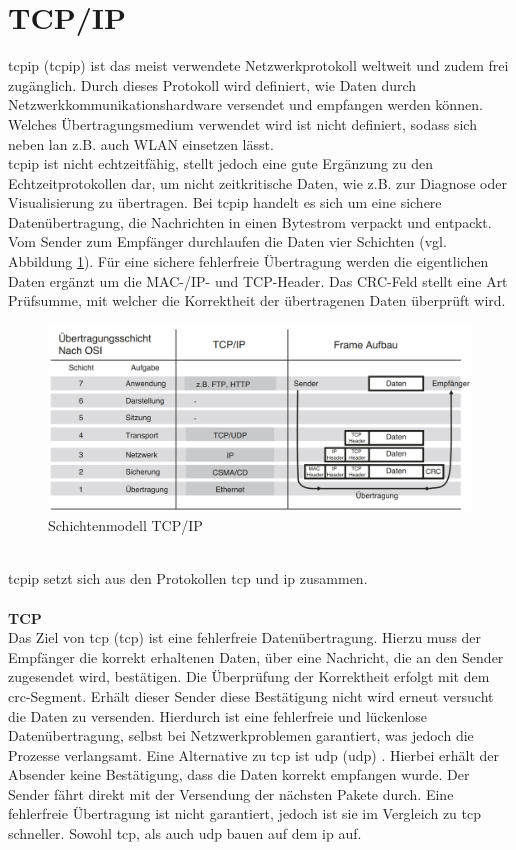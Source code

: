 \documentclass[ a4paper,
                oneside,
                toc=bibliography,
                toc=listof
                ]{scrbook}
\begin{document}
	\section{TCP/IP}
	\ac{tcpip} (\acl{tcpip}) ist das meist verwendete Netzwerkprotokoll weltweit und zudem frei zugänglich. Durch dieses Protokoll wird definiert, wie Daten durch Netzwerkkommunikationshardware versendet und empfangen werden können. Welches Übertragungsmedium verwendet wird ist  nicht definiert, sodass sich neben \ac{lan} z.B. auch WLAN einsetzen lässt.\cite{CS9_TCP} \cite{kim2016service} \\
	\ac{tcpip} ist nicht echtzeitfähig, stellt jedoch eine gute Ergänzung zu den Echtzeitprotokollen dar, um nicht zeitkritische Daten, wie z.B. zur Diagnose oder Visualisierung zu übertragen. Bei \ac{tcpip} handelt es sich um eine sichere Datenübertragung, die Nachrichten in einen Bytestrom verpackt und entpackt. Vom Sender zum Empfänger durchlaufen die Daten vier Schichten (vgl. Abbildung \ref{fig:Schichtenmodell}). Für eine sichere fehlerfreie Übertragung werden die eigentlichen Daten ergänzt um die MAC-/IP- und TCP-Header. Das CRC-Feld stellt eine Art Prüfsumme, mit welcher die Korrektheit der übertragenen Daten überprüft wird. \cite{hering2012elektrotechnik}
	\begin{figure}[!ht]
		\centering
		\includegraphics[width=1.0\linewidth]{./images/Schichtenmodell_TCP_IP.png}
		\caption{Schichtenmodell TCP/IP \cite{hering2012elektrotechnik}}
		\label{fig:Schichtenmodell}
	\end{figure} \\
	\ac{tcpip} setzt sich aus den Protokollen \acs{tcp} und \acs{ip} zusammen.\\
	\\
	\textbf{TCP}\\
	Das Ziel von \acs{tcp} (\acl{tcp}) ist eine fehlerfreie Datenübertragung. Hierzu muss der Empfänger die korrekt erhaltenen Daten, über eine Nachricht, die an den Sender zugesendet wird, bestätigen. Die Überprüfung der Korrektheit erfolgt mit dem \acs{crc}-Segment. Erhält dieser Sender diese Bestätigung nicht wird erneut versucht die Daten zu versenden. Hierdurch ist eine fehlerfreie und lückenlose Datenübertragung, selbst bei Netzwerkproblemen garantiert, was jedoch die Prozesse verlangsamt. Eine Alternative zu \acs{tcp} ist \acs{udp} (\acl{udp}) . Hierbei erhält der Absender keine Bestätigung, dass die Daten korrekt empfangen wurde. Der Sender fährt direkt mit der Versendung der nächsten Pakete durch. Eine fehlerfreie Übertragung ist nicht garantiert, jedoch ist sie im Vergleich zu \acs{tcp} schneller. Sowohl \acs{tcp}, als auch \acs{udp} bauen auf dem \ac{ip} auf. \cite{CS9_TCP}\\
\end{document}
